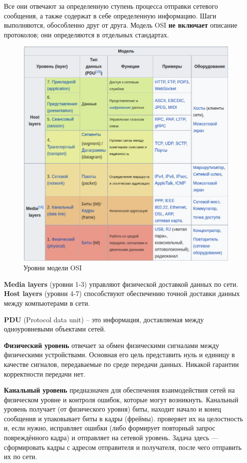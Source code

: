 Все они отвечают за определенную ступень процесса отправки сетевого сообщения, а также содержат в себе определенную информацию. Шаги выполняются, обособленно друг от друга. Модель OSI \textbf{не включает} описание протоколов; они определяются в отдельных стандартах.
\newline
\begin{figure}[H] \centering
	\includegraphics[scale = 0.6]{17/OSI.png}
	\caption{Уровни модели OSI}
\end{figure}

\textbf{Media layers} (уровни 1-3) управляют физической доставкой данных по сети.
\textbf{Host layers} (уровни 4-7) способствуют обеспечению точной доставки данных между компьютерами в сети.

\textbf{PDU} (Protocol data unit) -- это информация, доставляемая между одноуровневыми объектами сетей.

\textbf{Физический уровень} отвечает за обмен физическими сигналами между физическими устройствами. Основная его цель представить нуль и единицу в качестве сигналов, передаваемые по среде передачи данных. Никакой гарантии корректности передачи нет.

\textbf{Канальный уровень} предназначен для обеспечения взаимодействия сетей на физическом уровне и контроля ошибок, которые могут возникнуть. Канальный уровень получает (от физического уровня) биты, находит начало и конец сообщения и упаковывает биты в кадры (фреймы). проверяет их на целостность и, если нужно, исправляет ошибки (либо формирует повторный запрос повреждённого кадра) и отправляет на сетевой уровень. Задача здесь — сформировать кадры с адресом отправителя и получателя, после чего отправить их по сети.

